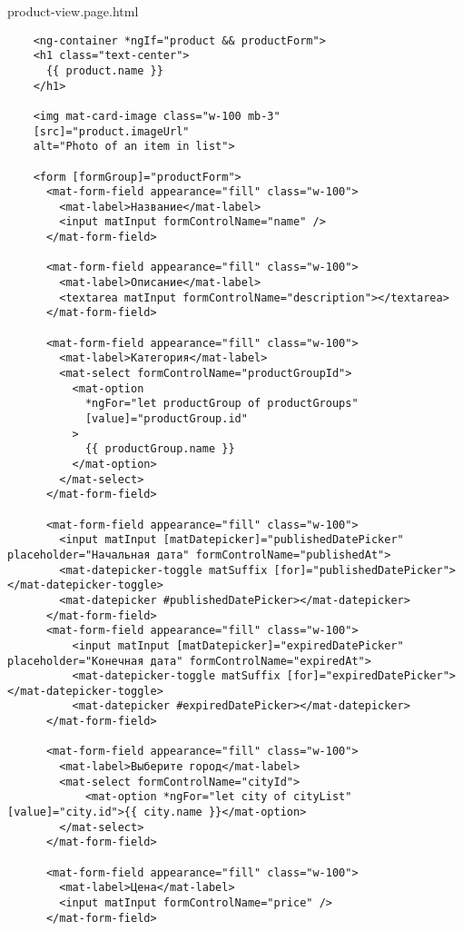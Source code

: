 product-view.page.html
\begin{lstlisting}
    <ng-container *ngIf="product && productForm">
    <h1 class="text-center">
      {{ product.name }}
    </h1>
  
    <img mat-card-image class="w-100 mb-3"
    [src]="product.imageUrl"
    alt="Photo of an item in list">
  
    <form [formGroup]="productForm">
      <mat-form-field appearance="fill" class="w-100">
        <mat-label>Название</mat-label>
        <input matInput formControlName="name" />
      </mat-form-field>
    
      <mat-form-field appearance="fill" class="w-100">
        <mat-label>Описание</mat-label>
        <textarea matInput formControlName="description"></textarea>
      </mat-form-field>
    
      <mat-form-field appearance="fill" class="w-100">
        <mat-label>Категория</mat-label>
        <mat-select formControlName="productGroupId">
          <mat-option
            *ngFor="let productGroup of productGroups"
            [value]="productGroup.id"
          >
            {{ productGroup.name }}
          </mat-option>
        </mat-select>
      </mat-form-field>
  
      <mat-form-field appearance="fill" class="w-100">
        <input matInput [matDatepicker]="publishedDatePicker" placeholder="Начальная дата" formControlName="publishedAt">
        <mat-datepicker-toggle matSuffix [for]="publishedDatePicker"></mat-datepicker-toggle>
        <mat-datepicker #publishedDatePicker></mat-datepicker>
      </mat-form-field>
      <mat-form-field appearance="fill" class="w-100">
          <input matInput [matDatepicker]="expiredDatePicker" placeholder="Конечная дата" formControlName="expiredAt">
          <mat-datepicker-toggle matSuffix [for]="expiredDatePicker"></mat-datepicker-toggle>
          <mat-datepicker #expiredDatePicker></mat-datepicker>
      </mat-form-field>
  
      <mat-form-field appearance="fill" class="w-100">
        <mat-label>Выберите город</mat-label>
        <mat-select formControlName="cityId">
            <mat-option *ngFor="let city of cityList" [value]="city.id">{{ city.name }}</mat-option>
        </mat-select>
      </mat-form-field>
    
      <mat-form-field appearance="fill" class="w-100">
        <mat-label>Цена</mat-label>
        <input matInput formControlName="price" />
      </mat-form-field>
    

\end{lstlisting}
